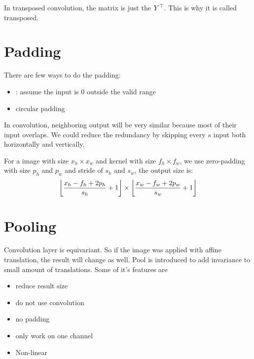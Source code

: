 In transposed convolution, the matrix is just the ${Y}^\top$. This is why it is called transposed.



\section{Padding}

There are few ways to do the padding:
\begin{itemize}
    \item {}: assume the input is $0$ outside the valid range
    \item circular padding
\end{itemize}

\begin{definition}
    In convolution, neighboring output will be very similar because most of their input overlaps. We could reduce the redundancy by skipping every $s$ input both horizontally and vertically.
\end{definition}

\begin{theorem}
    For a image with size $x_h \times x_w$ and kernel with size $f_h \times f_w$, we use zero-padding with size $p_h$ and $p_w$ and stride of $s_h$ and $s_w$, the output size is:
    \begin{equation}
        \mleft\lfloor \frac{x_h - f_h + 2p_h}{s_h} + 1 \mright\rfloor \times \mleft\lfloor \frac{x_w - f_w + 2p_w}{s_w} + 1 \mright\rfloor
    \end{equation}
\end{theorem}



\section{Pooling}

Convolution layer is equivariant. So if the image was applied with affine translation, the result will change as well. Pool is introduced to add invariance to small amount of translations. Some of it's features are
\begin{itemize}
    \item reduce result size
    \item do not use convolution
    \item no padding
    \item only work on one channel
    \item Non-linear
\end{itemize}

